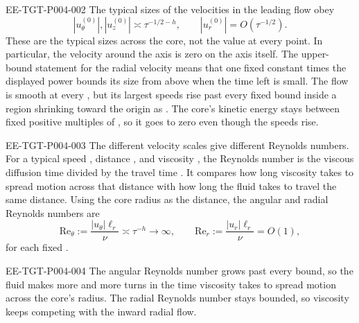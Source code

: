 \begin{EESegment}{EE-TGT-P004-002}
The typical sizes of the velocities in the leading flow obey
\begin{equation*}
  |u_\theta^{(0)}|,|u_z^{(0)}|\asymp\tau^{-1/2-h},
  \qquad |u_r^{(0)}|=O(\tau^{-1/2}).
\end{equation*}
These are the typical sizes across the core, not the value at every point. In particular, the
velocity around the axis is zero on the axis itself. The upper-bound statement for the radial
velocity means that one fixed constant times the displayed power bounds its size from above when
the time left is small. The flow is smooth at every , but its
largest speeds rise past every fixed bound inside a region shrinking toward the origin as
. The core's kinetic energy stays between fixed positive
multiples of , so it goes to zero even though the speeds rise.
\end{EESegment}

\begin{EESegment}{EE-TGT-P004-003}
The different velocity scales give different Reynolds numbers. For a typical speed
, distance , and viscosity
, the Reynolds number  is the viscous
diffusion time  divided by the travel time
. It compares how long viscosity takes to spread motion across that
distance with how long the fluid takes to travel the same distance. Using
the core radius as the distance, the angular and radial Reynolds numbers are
\begin{equation*}
  \mathrm{Re}_\theta:=\frac{|u_\theta|\ell_r}{\nu}\asymp\tau^{-h}\longrightarrow\infty,
  \qquad
  \mathrm{Re}_r:=\frac{|u_r|\ell_r}{\nu}=O(1),
\end{equation*}
for each fixed .
\end{EESegment}

\begin{EESegment}{EE-TGT-P004-004}
The angular Reynolds number grows past every bound, so the fluid makes more and more turns in
the time viscosity takes to spread motion across the core's radius. The radial Reynolds number
stays bounded, so viscosity keeps competing with the inward radial flow.
\end{EESegment}

